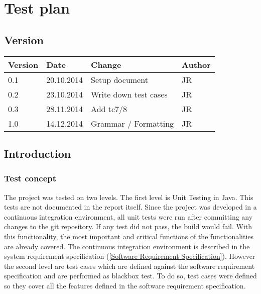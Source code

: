 
\chapter{Test plan} %

\label{Test plan} %



\section{Version}

\begin{tabular}{| p{1.5cm} | p{2cm} | p{9cm} | p{1.5cm} |}
    \hline
    Version & Date      & Change & Author \\ \hline
    0.1     & 20.10.2014        & Setup document                                        & JR \\ \hline
    0.2     & 23.10.2014        & Write down test cases                                        & JR \\ \hline
    0.3     & 28.11.2014        & Add tc7/8                                        & JR \\ \hline
    1.0     & 14.12.2014        & Grammar / Formatting                                        & JR \\ \hline
\end{tabular}


\section{Introduction}


\subsection{Test concept}

The project was tested on two levels. The first level is Unit Testing in Java. This tests are not documented in the report itself. Since the project was developed in a continuous integration environment, all unit tests were run after committing any changes to the git repository. If any test did not pass, the build would fail. With this functionality, the most important and critical functions of the functionalities are already covered. The continuous integration environment is described in the system requirement specification (\ref{Software Requirement Specification}). \linebreak 
However the second level are test cases which are defined against the software requirement specification and are performed as blackbox test.  To do so, test cases were defined so they cover all the features defined in the software requirement specification. 

